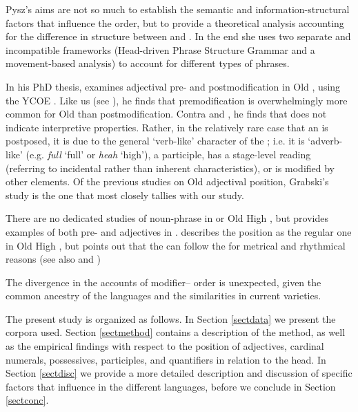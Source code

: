 \documentclass[output=paper,colorlinks,citecolor=brown,draft]{langscibook}
\begin{document}
 Pysz’s \citeyearpar{Pysz09} aims are not so much to establish the semantic and information-structural factors that influence the order, but to provide a theoretical analysis accounting for the difference in structure between  and  . In the end she uses two separate and incompatible frameworks (Head-driven Phrase Structure Grammar and a movement-based analysis) to account for different types of  phrases. 

In his PhD thesis, \citet{Grabski17} examines adjectival pre- and postmodification in Old , using the YCOE  \citep{YCOE}. Like us (see ), he finds that premodification is overwhelmingly more common for Old  than postmodification. Contra \citet{Fischer00, Fischer01,Fischer06, Fischer12} and \citet{Haumann03, Haumann10}, he finds that  does not indicate interpretive properties. Rather, in the relatively rare case that an  is postposed, it is due to the general ‘verb-like’ character of the ; i.e. it is ‘adverb-like’ (e.g. \textit{full} ‘full’ or \textit{heah} ‘high’), a participle, has a stage-level reading (referring to incidental rather than inherent characteristics), or is modified by other elements. Of the previous studies on Old  adjectival position, Grabski’s study is the one that most closely tallies with our study. 
	
There are no dedicated studies of noun-phrase  in  or Old High , but \citet{Walkden14} provides examples of both pre- and  adjectives in . \citet[37]{Schrodt04} describes the  position as the regular one in Old High , but points out that the  can follow the  for metrical and rhythmical reasons (see also \cite[70]{Demske01} and )
	
 The divergence in the accounts of modifier– order is unexpected, given the common ancestry of the languages and the similarities in current varieties. 	
	
 The present study is organized as follows. In Section \ref{sectdata} we present the corpora used. Section \ref{sectmethod} contains a description of the method, as well as the empirical findings with respect to the position of adjectives, cardinal numerals, possessives, participles, and quantifiers in relation to the  head. In Section \ref{sectdisc} we provide a more detailed description and discussion of specific factors that influence  in the different languages, before we conclude in Section \ref{sectconc}.
\end{document}
